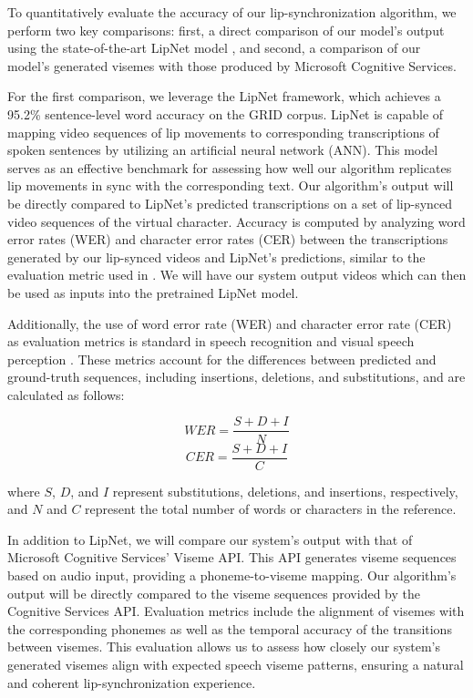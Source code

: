 \documentclass[12pt]{article}
\begin{document}
To quantitatively evaluate the accuracy of our lip-synchronization algorithm, we perform two key comparisons: first, a direct comparison of our model’s output using the state-of-the-art LipNet model \cite{assael2016lipnet}, and second, a comparison of our model’s generated visemes with those produced by Microsoft Cognitive Services.

For the first comparison, we leverage the LipNet framework, which achieves a 95.2\% sentence-level word accuracy on the GRID corpus. LipNet is capable of mapping video sequences of lip movements to corresponding transcriptions of spoken sentences by utilizing an artificial neural network (ANN). This model serves as an effective benchmark for assessing how well our algorithm replicates lip movements in sync with the corresponding text. Our algorithm’s output will be directly compared to LipNet’s predicted transcriptions on a set of lip-synced video sequences of the virtual character. Accuracy is computed by analyzing word error rates (WER) and character error rates (CER) between the transcriptions generated by our lip-synced videos and LipNet’s predictions, similar to the evaluation metric used in \cite{assael2016lipnet}.  We will have our system output videos which can then be used as inputs into the pretrained LipNet model.

Additionally, the use of word error rate (WER) and character error rate (CER) as evaluation metrics is standard in speech recognition and visual speech perception \cite{KLAKOW200219}. These metrics account for the differences between predicted and ground-truth sequences, including insertions, deletions, and substitutions, and are calculated as follows:

\[
WER = \frac{S + D + I}{N}
\]
\[
CER = \frac{S + D + I}{C}
\]

where $S$, $D$, and $I$ represent substitutions, deletions, and insertions, respectively, and $N$ and $C$ represent the total number of words or characters in the reference.

In addition to LipNet, we will compare our system’s output with that of Microsoft Cognitive Services’ Viseme API. This API generates viseme sequences based on audio input, providing a phoneme-to-viseme mapping. Our algorithm’s output will be directly compared to the viseme sequences provided by the Cognitive Services API. Evaluation metrics include the alignment of visemes with the corresponding phonemes as well as the temporal accuracy of the transitions between visemes. This evaluation allows us to assess how closely our system’s generated visemes align with expected speech viseme patterns, ensuring a natural and coherent lip-synchronization experience.
\end{document}
